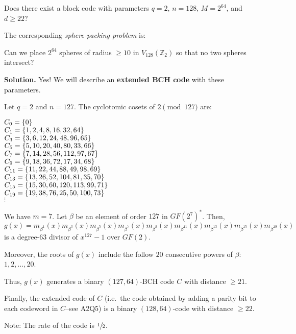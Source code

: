 \begin{Example}{}{}
    Does there exist a block code with parameters
    $ q=2 $, $ n=128 $, $ M=2^{64} $, and $ d\geqslant 22 $?

    The corresponding \emph{sphere-packing problem} is:

    Can we place $ 2^{64} $ spheres of radius
    $ \geqslant 10 $ in $ V_{128}(\mathbb{Z}_2) $
    so that no two spheres intersect?

    \textbf{Solution.} Yes! We will describe an
    \textbf{extended BCH code} with these parameters.

    Let $ q=2 $ and $ n=127 $. The cyclotomic cosets
    of $ 2\pmod{127} $ are:

    \begin{center}
        \begin{multicols}{2}
            $ C_0=\{0\} $\\
            $ C_1=\{1,2,4,8,16,32,64\} $\\
            $ C_3=\{3,6,12,24,48,96,65\} $\\
            $ C_5=\{5,10,20,40,80,33,66\} $\\
            $ C_7=\{7,14,28,56,112,97,67\} $\\
            $ C_9=\{9,18,36,72,17,34,68\} $\\
            $ C_{11}=\{11,22,44,88,49,98,69\} $\\
            $ C_{13}=\{13,26,52,104,81,35,70\} $\\
            $ C_{15}=\{15,30,60,120,113,99,71\} $\\
            $ C_{19}=\{19,38,76,25,50,100,73\} $\\
            $ \vdots $
        \end{multicols}
    \end{center}

    We have $ m=7 $. Let $ \beta $ be an element of order $ 127 $
    in $ GF(2^7)^* $. Then,
    \[ g(x)=m_{\beta^1}(x)m_{\beta^3}(x)m_{\beta^5}(x)m_{\beta^7}(x)
        m_{\beta^9}(x)m_{\beta^{11}}(x)m_{\beta^{13}}(x)
        m_{\beta^{15}}(x)m_{\beta^{19}}(x) \]
    is a degree-$ 63 $ divisor of $ x^{127}-1 $ over $ GF(2) $.

    Moreover, the roots of $ g(x) $ include the follow $ 20 $
    consecutive powers of $ \beta $: $ 1,2,\ldots ,20 $.

    Thus, $ g(x) $ generates a binary $ (127,64) $-BCH code
    $ C $ with distance $ \geqslant 21 $.

    Finally, the extended code of $ C $ (i.e.\ the code obtained
    by adding a parity bit to each codeword in $ C $--see A2Q5) is
    a binary $ (128,64) $-code with distance $ \geqslant 22 $.

    Note: The rate of the code is $ \sfrac{1}{2} $.
\end{Example}

